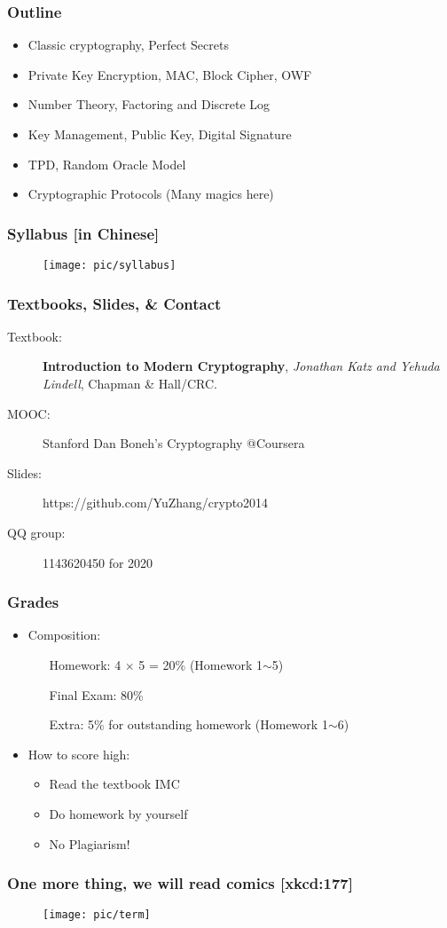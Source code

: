 \begin{frame}\frametitle{Outline}
\begin{itemize}
\item Classic cryptography, Perfect Secrets
\item Private Key Encryption, MAC, Block Cipher, OWF
\item Number Theory, Factoring and Discrete Log
\item Key Management, Public Key, Digital Signature
\item TPD, Random Oracle Model
\item Cryptographic Protocols (Many magics here)
\end{itemize}
\end{frame}
\begin{frame}\frametitle{Syllabus [in Chinese]}
\begin{figure}
\begin{center}
\texttt{[image: pic/syllabus]} 
\end{center}
\end{figure}
\end{frame}
\begin{frame}\frametitle{Textbooks, Slides, \& Contact}
\begin{description} 
\item[Textbook:] \textbf{Introduction to Modern Cryptography}, \emph{Jonathan Katz and Yehuda Lindell}, Chapman \& Hall/CRC.
\item[MOOC:] Stanford Dan Boneh's Cryptography @Coursera
\item[Slides:] https://github.com/YuZhang/crypto2014
\item[QQ group:] 1143620450 for 2020
\end{description}
\end{frame}
\begin{frame}\frametitle{Grades}
\begin{itemize}
\item Composition:
\begin{itemize}
\item[Homework:] 4 $\times$ 5 = 20\% (Homework 1$\sim$5)
\item[Final Exam:] 80\%
\item[Extra:]  5\% for outstanding homework (Homework 1$\sim$6)
\end{itemize}
\item How to score high:
\begin{itemize}
\item Read the textbook IMC
\item Do homework by yourself
\item \alert{No Plagiarism!} 
\end{itemize}
\end{itemize}
\end{frame}
\begin{frame}\frametitle{One more thing, we will read comics  [xkcd:177]}
\begin{figure}
\begin{center}
\texttt{[image: pic/term]} 
\end{center}
\end{figure}
\end{frame}
